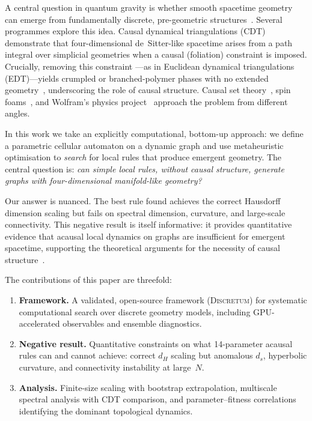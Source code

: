 \documentclass[aps,prd,twocolumn,superscriptaddress,floatfix]{revtex4-2}
\begin{document}
A central question in quantum gravity is whether smooth spacetime
geometry can emerge from fundamentally discrete, pre-geometric
structures~\cite{Loll2019,Ambjorn2012}.  Several programmes
explore this idea.  Causal dynamical triangulations
(CDT)~\cite{Ambjorn2004,Ambjorn2005} demonstrate that
four-dimensional de~Sitter-like spacetime arises from a path
integral over simplicial geometries when a causal (foliation)
constraint is imposed.  Crucially, removing this constraint
---as in Euclidean dynamical triangulations (EDT)---yields
crumpled or branched-polymer phases with no extended
geometry~\cite{Ambjorn2012}, underscoring the role of
causal structure.  Causal set
theory~\cite{Bombelli1987,Surya2019}, spin foams~\cite{Perez2013},
and Wolfram's physics project~\cite{Wolfram2020} approach the
problem from different angles.

In this work we take an explicitly computational, bottom-up approach:
we define a parametric cellular automaton on a dynamic graph and use
metaheuristic optimisation to \emph{search} for local rules that
produce emergent geometry.  The central question is: \emph{can simple
local rules, without causal structure, generate graphs with
four-dimensional manifold-like geometry?}

Our answer is nuanced.  The best rule found achieves the correct
Hausdorff dimension scaling but fails on spectral dimension,
curvature, and large-scale connectivity.  This negative result is
itself informative: it provides quantitative evidence that acausal
local dynamics on graphs are insufficient for emergent spacetime,
supporting the theoretical arguments for the necessity of causal
structure~\cite{Ambjorn2004,Loll2019}.

The contributions of this paper are threefold:
\begin{enumerate}
\item \textbf{Framework.}  A validated, open-source framework
  (\textsc{Discretum}) for systematic computational search over
  discrete geometry models, including GPU-accelerated observables
  and ensemble diagnostics.
\item \textbf{Negative result.}  Quantitative constraints on what
  14-parameter acausal rules can and cannot achieve: correct $d_H$
  scaling but anomalous $d_s$, hyperbolic curvature, and
  connectivity instability at large~$N$.
\item \textbf{Analysis.}  Finite-size scaling with bootstrap
  extrapolation, multiscale spectral analysis with CDT comparison,
  and parameter--fitness correlations identifying the dominant
  topological dynamics.
\end{enumerate}
\end{document}
